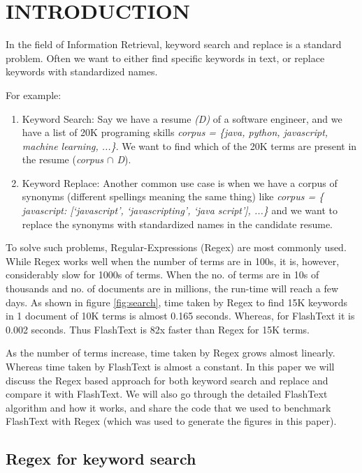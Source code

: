 \section{INTRODUCTION}

In the field of Information Retrieval, keyword search and replace is a standard problem. Often we want to either find specific keywords in text, or replace keywords with standardized names.

\noindent For example:

\begin{enumerate}
 \item Keyword Search: Say we have a resume \textit{(D)} of a software engineer, and we have a list of 20K programing skills \textit{corpus = \{java, python, javascript, machine learning, ...\}}. We want to find which of the 20K terms are present in the resume (\textit{corpus $\cap$ D}). 
 
 \item Keyword Replace: Another common use case is when we have a corpus of synonyms (different spellings meaning the same thing) like \textit{corpus = \{ javascript: [‘javascript’, ‘javascripting’, ‘java script’], ...\}} and we want to replace the synonyms with standardized names in the candidate resume.
  
\end{enumerate}

To solve such problems, Regular-Expressions (Regex) are most commonly used. While Regex works well when the number of terms are in 100s, it is, however, considerably slow for 1000s of terms. When the no. of terms are in 10s of thousands and no. of documents are in millions, the run-time will reach a few days. As shown in figure \ref{fig:search}, time taken by Regex to find 15K keywords in 1 document of 10K terms is almost 0.165 seconds. Whereas, for FlashText it is 0.002 seconds. Thus FlashText is 82x faster than Regex for 15K terms.\hfill\break

As the number of terms increase, time taken by Regex grows almost linearly. Whereas time taken by FlashText is almost a constant. In this paper we will discuss the Regex based approach for both keyword search and replace and compare it with FlashText. We will also go through the detailed FlashText algorithm and how it works, and share the code that we used to benchmark FlashText with Regex (which was used to generate the figures in this paper).\hfill\break

\subsection{Regex for keyword search}

